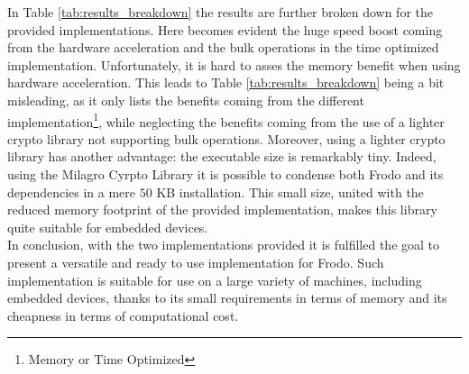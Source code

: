 In Table \ref{tab:results_breakdown} the results are further broken down for the provided implementations. Here becomes evident the huge speed boost coming from the hardware acceleration and the bulk operations in the time optimized implementation. Unfortunately, it is hard to asses the memory benefit when using hardware acceleration. This leads to Table \ref{tab:results_breakdown} being a bit misleading, as it only lists the benefits coming from the different implementation\footnote{Memory or Time Optimized}, while neglecting the benefits coming from the use of a lighter crypto library not supporting bulk operations. Moreover, using a lighter crypto library has another advantage: the executable size is remarkably tiny. Indeed, using the Milagro Cyrpto Library it is possible to condense both Frodo and its dependencies in a mere $50$ KB installation. This small size, united with the reduced memory footprint of the provided implementation, makes this library quite suitable for embedded devices.\\
In conclusion, with the two implementations provided it is fulfilled the goal to present a versatile and ready to use implementation for Frodo. Such implementation is suitable for use on a large variety of machines, including embedded devices, thanks to its small requirements in terms of memory and its cheapness in terms of computational cost.


